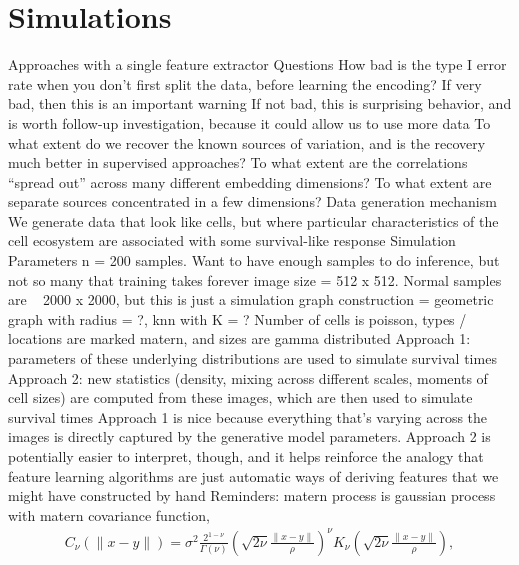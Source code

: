 \documentclass[11pt]{article}
\begin{document}
\section{Simulations}

\begin{outline}
  \1 Approaches with a single feature extractor
    \2 Questions
      \3 How bad is the type I error rate when you don't first split the data,
      before learning the encoding?
        \4 If very bad, then this is an important warning
        \4 If not bad, this is surprising behavior, and is worth follow-up
        investigation, because it could allow us to use more data
      \3 To what extent do we recover the known sources of variation, and is the
      recovery much better in supervised approaches?
        \4 To what extent are the correlations ``spread out'' across many
        different embedding dimensions? To what extent are separate sources
        concentrated in a few dimensions?
    \2 Data generation mechanism
      \3 We generate data that look like cells, but where particular
      characteristics of the cell ecosystem are associated with some
      survival-like response
      \3 Simulation Parameters
        \4 n = 200 samples. Want to have enough samples to do inference, but not
        so many that training takes forever
        \4 image size = 512 x 512. Normal samples are ~ 2000 x 2000, but this is
        just a simulation
        \4 graph construction = geometric graph with radius = ?, knn with K = ?
      \3 Number of cells is poisson, types / locations are marked matern, and
      sizes are gamma distributed
        \4 Approach 1: parameters of these underlying distributions are used to
        simulate survival times
        \4 Approach 2: new statistics (density, mixing across different scales,
        moments of cell sizes) are computed from these images, which are then
        used to simulate survival times
        \4 Approach 1 is nice because everything that's varying across the
        images is directly captured by the generative model parameters. Approach
        2 is potentially easier to interpret, though, and it helps reinforce the
        analogy that feature learning algorithms are just automatic ways of
        deriving features that we might have constructed by hand
        \4 Reminders: matern process is gaussian process with matern covariance
        function,
        \begin{align}
          C_{\nu}(\|x - y\|)=\sigma^{2} \frac{2^{1-\nu}}{\Gamma(\nu)}\left(\sqrt{2 \nu} \frac{\|x - y\|}{\rho}\right)^{\nu} K_{\nu}\left(\sqrt{2 \nu} \frac{\|x - y\|}{\rho}\right),

\end{align}
\end{outline}
\end{document}
